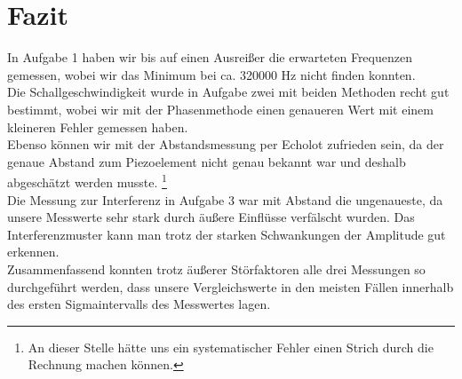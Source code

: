 \documentclass[12pt]{scrartcl}
\begin{document}
\section{Fazit}
In Aufgabe 1 haben wir bis auf einen Ausreißer die erwarteten Frequenzen gemessen, wobei wir das Minimum bei ca. 320000 Hz nicht finden konnten.\\
Die Schallgeschwindigkeit wurde in Aufgabe zwei mit beiden Methoden recht gut bestimmt, wobei wir mit der Phasenmethode einen genaueren Wert mit einem kleineren Fehler gemessen haben.\\
Ebenso können wir mit der Abstandsmessung per Echolot zufrieden sein, da der genaue Abstand zum Piezoelement nicht genau bekannt war und deshalb abgeschätzt werden musste.
\footnote{An dieser Stelle hätte uns ein systematischer Fehler einen Strich durch die Rechnung machen können.}\\
Die Messung zur Interferenz in Aufgabe 3 war mit Abstand die ungenaueste, da unsere Messwerte sehr stark durch äußere Einflüsse verfälscht wurden. Das Interferenzmuster kann man trotz der starken Schwankungen der Amplitude gut erkennen.\\
Zusammenfassend konnten trotz äußerer Störfaktoren alle drei Messungen so durchgeführt werden, dass unsere Vergleichswerte in den meisten Fällen innerhalb des ersten Sigmaintervalls des Messwertes lagen. 

\end{document}
